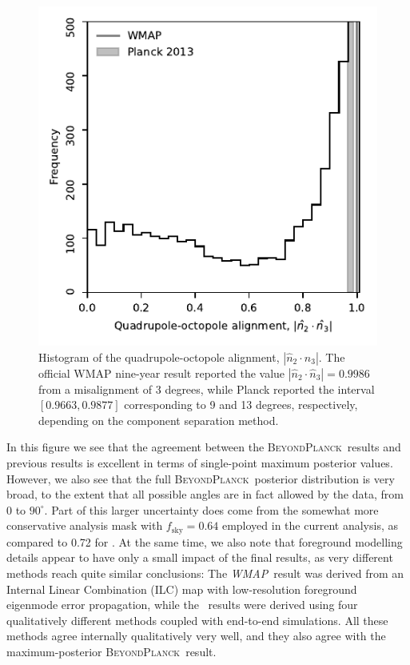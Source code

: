\documentclass[twocolumn]{aa}
\def\WMAP{\textit{WMAP}}
\newcommand{\BP}{\textsc{BeyondPlanck}}
\begin{document}
\begin{figure}
  \includegraphics[width=\linewidth]{figs/n_2_n_3.pdf}
  \caption{Histogram of the quadrupole-octopole alignment, $|\hat{n}_2\cdot\hat{n}_3|$. The official WMAP nine-year result reported the value $|\hat{n}_2\cdot\hat{n}_3| = 0.9986$ \citep{bennett2012} from a misalignment of 3 degrees, while Planck \citep{Planck:2013lks} reported the interval $[0.9663, 0.9877]$ corresponding to 9 and 13 degrees, respectively, depending on the component separation method.}
  \label{fig:n_2_n_3}
\end{figure}

In this figure we see that the agreement between the \BP\ results and
previous results is excellent in terms of single-point maximum
posterior values. However, we also see that the full \BP\ posterior
distribution is very broad, to the extent that all possible angles are
in fact allowed by the data, from 0 to $90^{\circ}$. Part of this
larger uncertainty does come from the somewhat more conservative
analysis mask with $f_{\mathrm{sky}}=0.64$ employed in the current
analysis, as compared to 0.72 for \citet{Planck:2013lks}. At the same
time, we also note that foreground modelling details appear to have
only a small impact of the final results, as very different methods
reach quite similar conclusions: The \WMAP\ result was derived from an
Internal Linear Combination (ILC) map with low-resolution foreground
eigenmode error propagation, while the \Planck\ results were derived
using four qualitatively different methods coupled with end-to-end
simulations. All these methods agree internally qualitatively very
well, and they also agree with the maximum-posterior \BP\ result.
\end{document}
